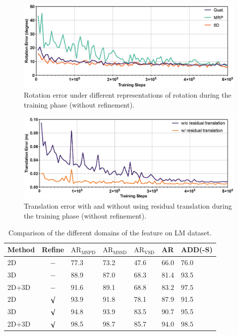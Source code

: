 \documentclass[12pt,DIV14,BCOR12mm,a4paper,footinclude=false,headinclude,parskip=half-,twoside,openright,cleardoublepage=empty,toc=index,bibliography=totoc,listof=totoc]{scrreprt}
\numberwithin{equation}{chapter}
\begin{document}
\begin{figure}[H]
	\centering
	\includegraphics[width=1.\textwidth]{img/ab_rot.eps}
	\caption{Rotation error under different representations of rotation during the training phase (without refinement).}
	\label{img:ab_rot}
\end{figure}

\begin{figure}[H]
	\centering
	\includegraphics[width=1.\textwidth]{img/ab_trans.eps}
	\caption{Translation error with and without using residual translation during the training phase (without refinement).}
	\label{img:ab_trans}
\end{figure}

\begin{table}[H]
  \centering
  \caption{Comparison of the different domains of the feature on LM dataset.}
  \label{tab:ab_feat_lm}
  \begin{tabular}{l | c | C{16mm} C{16mm} C{16mm}| C{16mm}| C{16mm}}
      \toprule
      Method & Refine & $\text{AR}_{\text{MSPD}}$ & $\text{AR}_{\text{MSSD}}$ & $\text{AR}_{\text{VSD}}$ & AR & ADD(-S) \\
      \midrule
      2D  & $-$ & 77.3 & 73.2 & 47.6 & 66.0 & 76.0 \\
      3D & $-$ & 88.9 & 87.0 & 68.3 & 81.4 & 93.5 \\
      2D+3D  & $-$ & 91.6 & 89.1 & 68.8 & $\mathbf{83.2}$ & $\mathbf{97.5}$ \\
      2D  & $\surd$ & 93.9 & 91.8 & 78.1 & 87.9 & 91.5 \\
      3D & $\surd$ & 94.8 & 93.9 & 83.5 & 90.7 & 95.5 \\
      2D+3D  & $\surd$ & 98.5 & 98.7 & 85.7 & $\mathbf{94.0}$ & $\mathbf{98.5}$ \\
      \bottomrule
  \end{tabular}
\end{table}
\end{document}
